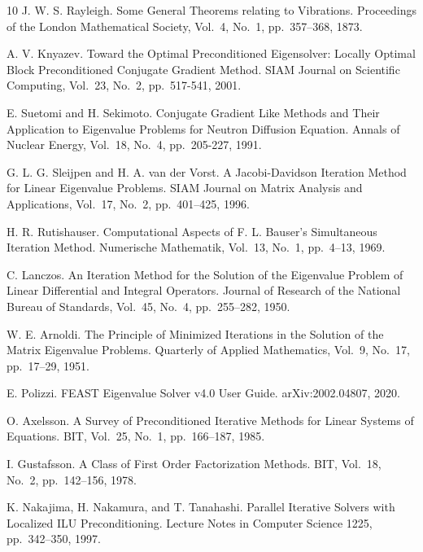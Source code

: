 \documentclass[a4paper]{jarticle}
\begin{document}
{{\begin{thebibliography}{10}
J. W. S. Rayleigh.
\newblock Some General Theorems relating to Vibrations.
\newblock Proceedings of the London Mathematical Society, Vol.~4, No.~1,
	pp.\ 357--368, 1873.

A. V. Knyazev.
\newblock Toward the Optimal Preconditioned Eigensolver: Locally Optimal
	Block Preconditioned Conjugate Gradient Method.
\newblock SIAM Journal on Scientific Computing, Vol.~23, No.~2, pp.\ 517-541, 2001. 

E. Suetomi and H. Sekimoto.
\newblock Conjugate Gradient Like Methods and Their Application to
	Eigenvalue Problems for Neutron Diffusion Equation.
\newblock Annals of Nuclear Energy, Vol.~18, No.~4, pp.\ 205-227, 1991.

G. L. G. Sleijpen and H. A. van der Vorst.
\newblock A Jacobi-Davidson Iteration Method for Linear Eigenvalue Problems.
\newblock SIAM Journal on Matrix Analysis and Applications, Vol.~17, No.~2, pp.\ 401--425, 1996.

H. R. Rutishauser.
\newblock Computational Aspects of F. L. Bauser's Simultaneous Iteration
	Method.
\newblock Numerische Mathematik, Vol.~13, No.~1, pp.\ 4--13, 1969.

C. Lanczos.
\newblock An Iteration Method for the Solution of the Eigenvalue Problem
	of Linear Differential and Integral Operators.
\newblock Journal of Research of the National Bureau of Standards, Vol.~45, No.~4, pp.\ 255--282, 1950.

W. E. Arnoldi.
\newblock The Principle of Minimized Iterations in the Solution of the Matrix Eigenvalue Problems.
\newblock Quarterly of Applied Mathematics, Vol.~9, No.~17, pp.\ 17--29, 1951.

E. Polizzi.
\newblock FEAST Eigenvalue Solver v4.0 User Guide.
\newblock arXiv:2002.04807, 2020.
  
O. Axelsson.
\newblock A Survey of Preconditioned Iterative Methods for Linear
	Systems of Equations.
\newblock BIT, Vol.~25, No.~1, pp.\ 166--187, 1985.

I. Gustafsson.
\newblock A Class of First Order Factorization Methods.
\newblock BIT, Vol.~18, No.~2, pp.\ 142--156, 1978.

K. Nakajima, H. Nakamura, and T. Tanahashi.
\newblock Parallel Iterative Solvers with Localized ILU Preconditioning.
\newblock Lecture Notes in Computer Science 1225, pp.\ 342--350, 1997.


\end{thebibliography}}}
\end{document}

